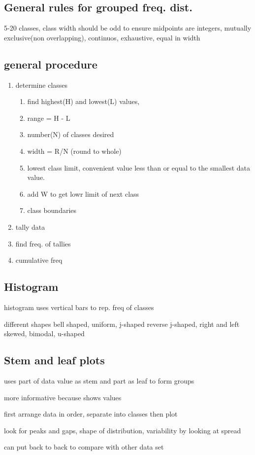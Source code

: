 \documentclass[11pt]{amsart}
\begin{document}
\subsection{General rules for grouped freq. dist.}
\par 5-20 classes, class width should be odd to ensure midpoints are
integers, mutually exclusive(non overlapping), continuos, exhaustive,
equal in width
\subsection{general procedure}
\begin{enumerate}
  \item determine classes
    \begin{enumerate}
      \item find highest(H) and lowest(L) values,
      \item range = H - L
      \item number(N) of classes desired
      \item width =  R/N (round to whole)
      \item lowest class limit, convenient value less than or equal to the
        smallest data value.
      \item add W to get lowr limit of next class
      \item class boundaries
    \end{enumerate}
  \item tally data
  \item find freq. of tallies
  \item cumulative freq
\end{enumerate}
\subsection{Histogram}
  \par histogram uses vertical bars to rep. freq of classes
  \par different shapes bell shaped, uniform, j-shaped
  reverse j-shaped, right and left skewed, bimodal, u-shaped
\subsection{Stem and leaf plots}
  \par uses part of data value as stem and part as leaf to form groups
  \par more informative because shows values
  \par first arrange data in order, separate into classes then plot
  \par look for peaks and gaps, shape of distribution, variability by looking
  at spread
  \par can put back to back to compare with other data set
\end{document}
